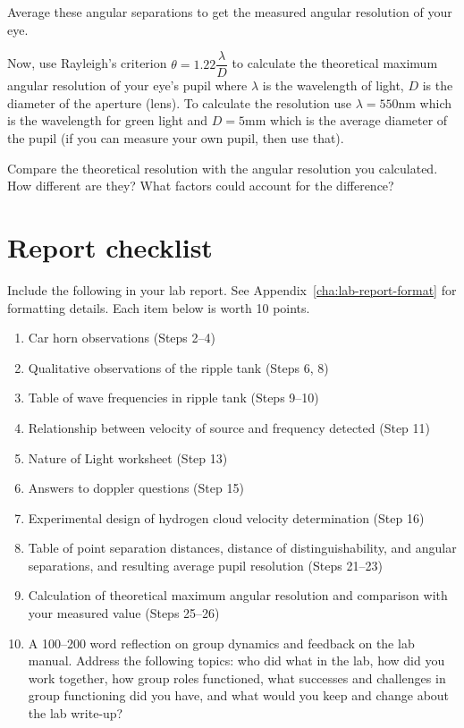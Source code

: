 \begin{steps}
	\item Average these angular separations to get the measured angular resolution of your eye.
		
	
	\item Now, use Rayleigh's criterion $\theta = 1.22 \dfrac{\lambda}{D}$ to calculate the theoretical maximum angular resolution of your eye's pupil where $\lambda$ is the wavelength of light, $D$ is the diameter of the aperture (lens). To calculate the resolution use $\lambda = 550$nm which is the wavelength for green light and $D=5$mm which is the average diameter of the pupil (if you can measure your own pupil, then use that).
	
	\item Compare the theoretical resolution with the angular resolution you calculated. How different are they? What factors could account for the difference?
\end{steps}

\section{Report checklist}

Include the following in your lab report. See Appendix~\ref{cha:lab-report-format} for formatting details. Each item below is worth 10 points.

\begin{enumerate}
	\item Car horn observations (Steps 2--4)
	\item Qualitative observations of the ripple tank (Steps 6, 8)
	\item Table of wave frequencies in ripple tank (Steps 9--10)
	\item Relationship between velocity of source and frequency detected (Step 11)
	\item Nature of Light worksheet (Step 13)
	\item Answers to doppler questions (Step 15)
	\item Experimental design of hydrogen cloud velocity determination (Step 16)
	\item Table of point separation distances, distance of distinguishability, and angular separations, and resulting average pupil resolution (Steps 21--23)
	\item Calculation of theoretical maximum angular resolution and comparison with your measured value (Steps 25--26)
	\item A 100--200 word reflection on group dynamics and feedback on the lab manual. Address the following topics: who did what in the lab, how did you work together, how group roles functioned, what successes and challenges in group functioning did you have, and what would you keep and change about the lab write-up?
\end{enumerate}